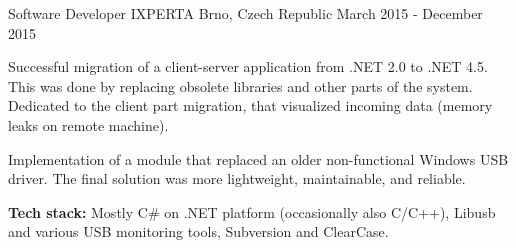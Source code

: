 \begin{cventries}
  \cventry
    {Software Developer}
    {IXPERTA}
    {Brno, Czech Republic}
    {March 2015 - December 2015}
    {
      \begin{cvitems}
        \item {Successful migration of a client-server application from .NET 2.0 to .NET 4.5. This was done by replacing obsolete libraries and other parts of the system. Dedicated to the client part migration, that visualized incoming data (memory leaks on remote machine).}
        \item {Implementation of a module that replaced an older non-functional Windows USB driver. The final solution was more lightweight, maintainable, and reliable.}
        \item {{\fontsize{11.2pt}{1em}\bodyfont\bfseries\color{darktext}Tech stack:} Mostly C\# on .NET platform (occasionally also C/C++), Libusb and various USB monitoring tools, Subversion and ClearCase.}
      \end{cvitems}
    }

\end{cventries}
